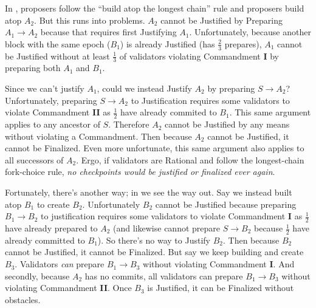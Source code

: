\documentclass[12pt]{article}
\begin{document}
In , proposers follow the ``build atop the longest chain'' rule and proposers build atop $A_2$.  But this runs into problems.  $A_2$ cannot be Justified by Preparing $A_1 \to A_2$ because that requires first Justifying $A_1$.  Unfortunately, because another block with the same epoch ($B_1$) is already Justified (has $\frac{2}{3}$ prepares), $A_1$ cannot be Justified without at least $\frac{1}{3}$ of validators violating Commandment \textbf{I} by preparing both $A_1$ and $B_1$.

Since we can't justify $A_1$, could we instead Justify $A_2$ by preparing $S \to A_2$?  Unfortunately, preparing $S \to A_2$ to Justification requires some validators to violate Commandment \textbf{II} as $\frac{1}{2}$ have already commited to $B_1$.  This same argument applies to any ancestor of $S$.  Therefore $A_2$ cannot be Justified by any means without violating a Commandment.  Then because $A_2$ cannot be Justified, it cannot be Finalized.  Even more unfortunate, this same argument also applies to all successors of $A_2$.  Ergo, if validators are Rational and follow the longest-chain fork-choice rule, \emph{no checkpoints would be justified or finalized ever again}.

Fortunately, there's another way; in  we see the way out.  Say we instead built atop $B_1$ to create $B_2$.  Unfortunately $B_2$ cannot be Justified because preparing $B_1 \to B_2$ to justification requires some validators to violate Commandment \textbf{I} as $\frac{1}{2}$ have already prepared to $A_2$ (and likewise cannot prepare $S \to B_2$ because $\frac{1}{2}$ have already committed to $B_1$).  So there's no way to Justify $B_2$.  Then because $B_2$ cannot be Justified, it cannot be Finalized.  But say we keep building and create $B_3$.  Validators \emph{can} prepare $B_1 \to B_3$ without violating Commandment \textbf{I}.  And secondly, because $A_2$ has no commits, all validators can prepare $B_1 \to B_3$ without violating Commandment \textbf{II}.  Once $B_3$ is Justified, it can be Finalized without obstacles.
\end{document}
